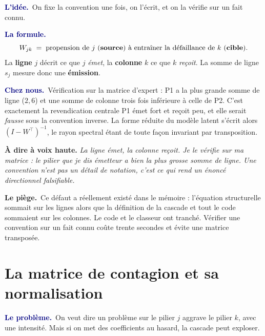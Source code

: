 \documentclass[11pt,a4paper]{article}
\newcommand{\lequoi}[1]{\smallskip\noindent\textcolor{navy}{\textbf{Le problème.}}\ #1\par}
\newcommand{\lidee}[1]{\smallskip\noindent\textcolor{navy}{\textbf{L'idée.}}\ #1\par}
\newcommand{\laformule}[1]{\smallskip\noindent\textcolor{navy}{\textbf{La formule.}}\ #1\par}
\newcommand{\cheznous}[1]{\smallskip\noindent\textcolor{navy}{\textbf{Chez nous.}}\ #1\par}
\newcommand{\lepiege}[1]{\smallskip\noindent\textcolor{accent}{\textbf{Le piège.}}\ #1\par}
\newcommand{\laphrase}[1]{\begin{phrasebox}\textbf{À dire à voix haute.} \emph{#1}\end{phrasebox}}
\begin{document}
\lidee{On fixe la convention une fois, on l'écrit, et on la vérifie sur un fait connu.}

\laformule{\[
  W_{jk}\;=\;\text{propension de } j \text{ (\textbf{source}) à entraîner la défaillance de }
  k \text{ (\textbf{cible}).}
\]
La \textbf{ligne} $j$ décrit ce que $j$ \emph{émet}, la \textbf{colonne} $k$ ce que $k$
\emph{reçoit}. La somme de ligne $s_j$ mesure donc une \textbf{émission}.}

\cheznous{Vérification sur la matrice d'expert : P1 a la plus grande somme de ligne ($2{,}6$)
et une somme de colonne trois fois inférieure à celle de P2. C'est exactement la revendication
centrale \og{}P1 émet fort et reçoit peu\fg{}, et elle serait \emph{fausse} sous la convention
inverse. La forme réduite du modèle latent s'écrit alors $(I-W^{\top})^{-1}$, le rayon spectral
étant de toute façon invariant par transposition.}

\laphrase{La ligne émet, la colonne reçoit. Je le vérifie sur ma matrice : le pilier que je dis
émetteur a bien la plus grosse somme de ligne. Une convention n'est pas un détail de notation,
c'est ce qui rend un énoncé directionnel falsifiable.}

\lepiege{Ce défaut a réellement existé dans le mémoire : l'équation structurelle sommait sur
les lignes alors que la définition de la cascade et tout le code sommaient sur les colonnes. Le
code et le classeur ont tranché. Vérifier une convention sur un fait connu coûte trente
secondes et évite une matrice transposée.}

\section{La matrice de contagion et sa normalisation}

\lequoi{On veut dire \og un problème sur le pilier $j$ aggrave le pilier $k$\fg{}, avec une
intensité. Mais si on met des coefficients au hasard, la cascade peut exploser.}
\end{document}
